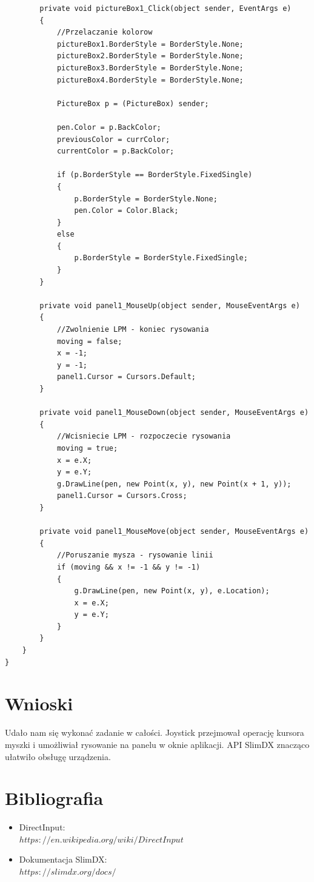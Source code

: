 \documentclass[12pt,a4paper,notitlepage]{report}
\begin{document}
\begin{adjustwidth}{0pt}{-50pt}
\begin{lstlisting}
        private void pictureBox1_Click(object sender, EventArgs e)
        {
        	//Przelaczanie kolorow
            pictureBox1.BorderStyle = BorderStyle.None;
            pictureBox2.BorderStyle = BorderStyle.None;
            pictureBox3.BorderStyle = BorderStyle.None;
            pictureBox4.BorderStyle = BorderStyle.None;
            
            PictureBox p = (PictureBox) sender;

            pen.Color = p.BackColor;
            previousColor = currColor;
            currentColor = p.BackColor;

            if (p.BorderStyle == BorderStyle.FixedSingle)
            {
                p.BorderStyle = BorderStyle.None;
                pen.Color = Color.Black;
            }
            else
            {
                p.BorderStyle = BorderStyle.FixedSingle;
            }
        }

        private void panel1_MouseUp(object sender, MouseEventArgs e)
        {
        	//Zwolnienie LPM - koniec rysowania
            moving = false;
            x = -1;
            y = -1;
            panel1.Cursor = Cursors.Default;
        }

        private void panel1_MouseDown(object sender, MouseEventArgs e)
        {
        	//Wcisniecie LPM - rozpoczecie rysowania
            moving = true;
            x = e.X;
            y = e.Y;
            g.DrawLine(pen, new Point(x, y), new Point(x + 1, y));
            panel1.Cursor = Cursors.Cross;
        }

        private void panel1_MouseMove(object sender, MouseEventArgs e)
        {
        	//Poruszanie mysza - rysowanie linii
            if (moving && x != -1 && y != -1)
            {
                g.DrawLine(pen, new Point(x, y), e.Location);
                x = e.X;
                y = e.Y;
            }
        }
    }
}

\end{lstlisting}

\end{adjustwidth}
\section{Wnioski}
Udało nam się wykonać zadanie w całości. Joystick przejmował operację kursora myszki i umożliwiał rysowanie na panelu w oknie aplikacji. API SlimDX znacząco ułatwiło obsługę urządzenia.
\section{Bibliografia}
\begin{itemize}
\item DirectInput:
\\
$https://en.wikipedia.org/wiki/DirectInput$
\item Dokumentacja SlimDX:
\\
$https://slimdx.org/docs/$
\end{itemize}
\end{document}
